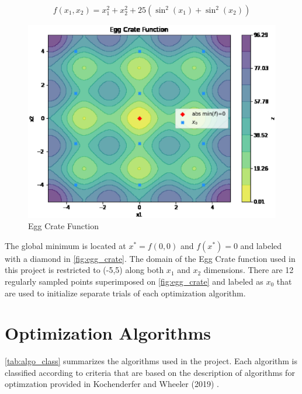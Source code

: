 \documentclass{vgtc}                          %
\begin{document}
\begin{equation}
f(x_1, x_2) = x_1^2 + x_2^2 + 25 (\sin^2(x_1) + \sin^2(x_2))
\end{equation}

\begin{figure}[tb]
\centering
\includegraphics[width=\columnwidth]{figures/pictures/images/egg_crate-plot2d.eps}
\caption{Egg Crate Function}
\label{fig:egg_crate}
\end{figure}

The global minimum is located at $x^* = f(0, 0)$ and $f(x^*) = 0$ and labeled with a diamond in \autoref{fig:egg_crate}.  The domain of the Egg Crate function used in this project is restricted to (-5,5) along both $x_1$ and $x_2$ dimensions.  There are 12 regularly sampled points superimposed on \autoref{fig:egg_crate} and labeled as $x_0$ that are used to initialize separate trials of each optimization algorithm.

\section{Optimization Algorithms}

\autoref{tab:algo_class} summarizes the algorithms used in the project. Each algorithm is classified according to criteria that are based on the description of algorithms for optimzation provided in Kochenderfer and Wheeler (2019) \cite{Kochenderfer:2019}.
\end{document}
